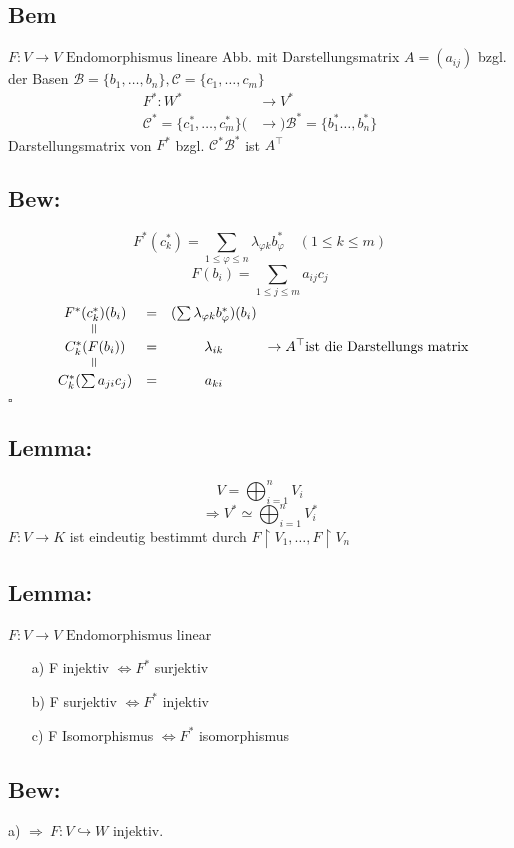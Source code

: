 \documentclass[titlepage,12pt,a4paper,ngerman]{report}
\newenvironment{bew}{\subsection{Bew:}}{\hfill$\square$}
\newcommand{\Bew}[1]{\begin{bew}#1\end{bew}}
\newcommand{\tx}[1]{\textrm{#1}}
\newcommand{\enph}{F: V \to V \textrm{ Endomorphismus}}
\begin{document}
\subsection*{Bem}
$ \enph $ lineare Abb. mit Darstellungsmatrix $ A = (a_{ij}) $ bzgl. der Basen $ \mathcal{B} = \{b_1,\dots ,b_n\} , \mathcal{C}= \{c_1,\dots,c_m\} $\\

\begin{align*}
F^*: W^* &\to V^* \\
\mathcal{C}^* = \{ c^*_1,\dots , c^*_m\} (&\rightarrow) \mathcal{B}^* = \{b^*_1  \dots , b^*_n\} 
\end{align*} 
Darstellungsmatrix von $ F^* $ bzgl. $ \mathcal{C}^* \mathcal{B}^* $ ist $ A^\top $

\Bew{
	$$F^* (c_k^*) = \sum _{1\leq \varphi \leq n} \lambda_{\varphi k}b_\varphi^* \quad (1\leq k \leq m)$$
	$$F(b_i) = \sum _{1\leq j \leq m} a_{ij} c_j$$
	$$ \begin{array}{ccc}
	F^* (c_k^*) (b_i) & = &(\sum \lambda_{\varphi k} b_\varphi^*) (b_i)\\
	\rotatebox{90}{=} & &  \\
	C_k^* (F(b_i)) & = & \lambda_{ik}\\
	\rotatebox{90}{=} & & \\
	C_k^*(\sum a_{ji}c_j) & = & a_{ki}
	\end{array} \rightarrow A^\top \tx{ist die Darstellungs matrix}$$
}

\subsection{Lemma:}
$$ V = \bigoplus_{i = 1}^{n} V_i$$
$$ \Rightarrow V^* \simeq \bigoplus_{i=1}^{n} V_i^*$$
$ F: V \to K $ ist eindeutig bestimmt durch $ F \upharpoonright V_1, \dots , F \upharpoonright V_n $
\subsection{Lemma:}
$ \enph $ linear
\begin{itemize}
	\item[a)] F injektiv $ \Leftrightarrow F^* $ surjektiv
	\item[b)] F surjektiv $ \Leftrightarrow F^* $ injektiv
	\item[c)] F Isomorphismus $ \Leftrightarrow F^* $ isomorphismus
\end{itemize}

\subsection{Bew:}
a) $\boxed{\Rightarrow}\ F: V \hookrightarrow W$ injektiv.
\end{document}
